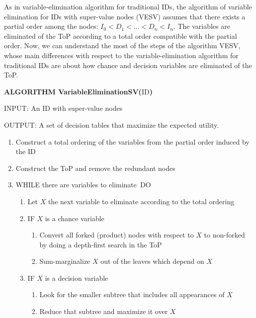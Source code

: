 As in variable-elimination algorithm for traditional IDs, the algorithm of
variable elimination for IDs with super-value nodes (VESV) assumes that
there exists a partial order among the nodes: {\normalsize $%
I_{0}<D_{1}<\ldots <D_{n}<I_{n}.$ }The variables are eliminated of the ToP
according to a total order compatible with the partial order. Now, we can
understand the most of the steps of the algorithm VESV, whose main
differences with respect to the variable-elimination algorithm for
traditional IDs are about how chance and decision variables are eliminated
of the ToP.

\noindent \textsf{\textbf{ALGORITHM VariableEliminationSV(}ID\textbf{)}}

\bigskip \noindent INPUT: An ID with super-value nodes

\noindent OUTPUT: A set of decision tables that maximize the expected
utility.

\begin{enumerate}
\item Construct a total ordering of the variables from the partial order
induced by the ID

\item Construct the ToP and remove the redundant nodes

\item WHILE there are variables to eliminate{\normalsize \ }DO

\begin{enumerate}
\item Let $X$ the next variable to eliminate according to the total ordering

\item IF $X$ is a chance variable

\begin{enumerate}
\item Convert all forked (product) nodes with respect to $X$ to non-forked
by doing a depth-first search in the ToP

\item Sum-marginalize $X$ out of the leaves which depend on $X$
\end{enumerate}

\item IF $X$ is a decision variable

\begin{enumerate}
\item Look for the smaller subtree that includes all appearances of $X$

\item Reduce that subtree and maximize it over $X$
\end{enumerate}
\end{enumerate}
\end{enumerate}

